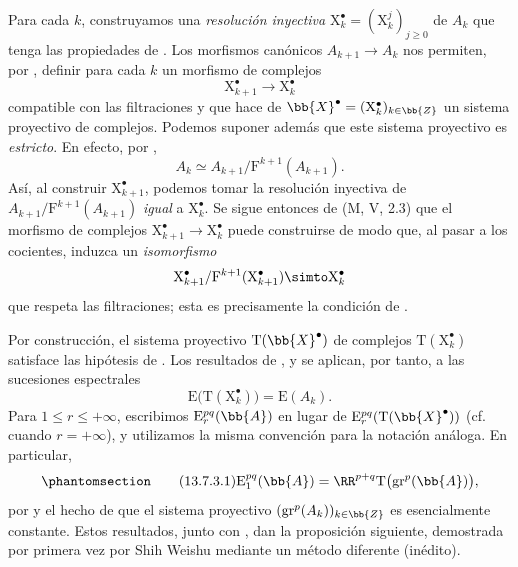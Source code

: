\documentclass[oneside]{amsart}
\renewcommand{\leq}{\leqslant}
\renewcommand{\geq}{\geqslant}
\newcommand{\oldpage}[2][]{{\marginnote{\normalfont\textbf{#1}~|~#2}}\ignorespaces}
\let\EGAOriginalLabel\label
\renewcommand{\label}[1]{\phantomsection\EGAOriginalLabel{#1}}
\begin{document}
\begin{env}[13.7.2]
\label{0.13.7.2}
Para cada $k$, construyamos una \emph{resolución inyectiva}
$\mathrm{X}_k^\bullet=(\mathrm{X}_k^j)_{j\geq0}$ de $A_k$ que tenga las
propiedades de .
Los morfismos canónicos $A_{k+1}\longrightarrow A_k$ nos permiten, por
, definir para cada $k$ un morfismo de complejos
\[
  \mathrm{X}_{k+1}^\bullet\longrightarrow\mathrm{X}_k^\bullet
\]
compatible con las filtraciones y que hace de
$\bb{X}^\bullet=(\mathrm{X}_k^\bullet)_{k\in\bb{Z}}$ un sistema
proyectivo de complejos.
\oldpage[0\textsubscript{III}]{76}
Podemos suponer además que este sistema proyectivo es \emph{estricto}.
En efecto, por ,
\[
  A_k
  \simeq
  A_{k+1}/\mathrm{F}^{k+1}(A_{k+1}).
\]
Así, al construir $\mathrm{X}_{k+1}^\bullet$, podemos tomar la
resolución inyectiva de
$A_{k+1}/\mathrm{F}^{k+1}(A_{k+1})$ \emph{igual} a
$\mathrm{X}_k^\bullet$.
Se sigue entonces de (M, V, 2.3) que el morfismo de complejos
$\mathrm{X}_{k+1}^\bullet\longrightarrow\mathrm{X}_k^\bullet$ puede
construirse de modo que, al pasar a los cocientes, induzca un
\emph{isomorfismo}
\[
  \mathrm{X}_{k+1}^\bullet/
  \mathrm{F}^{k+1}(\mathrm{X}_{k+1}^\bullet)
  \simto
  \mathrm{X}_k^\bullet
\]
que respeta las filtraciones; esta es precisamente la condición de
.
\end{env}

\begin{env}[13.7.3]
\label{0.13.7.3}
Por construcción, el sistema proyectivo
$\mathrm{T}(\bb{X}^\bullet)$ de complejos
$\mathrm{T}(\mathrm{X}_k^\bullet)$ satisface las hipótesis de
.
Los resultados de ,  y
 se aplican, por tanto, a las sucesiones espectrales
\[
  \mathrm{E}\bigl(\mathrm{T}(\mathrm{X}_k^\bullet)\bigr)
  =
  \mathrm{E}(A_k).
\]
Para $1\leq r\leq+\infty$, escribimos
$\mathrm{E}_r^{pq}(\bb{A})$ en lugar de
$\mathrm{E}_r^{pq}(\mathrm{T}(\bb{X}^\bullet))$
(cf.\  cuando $r=+\infty$), y utilizamos la misma convención
para la notación análoga.
En particular,
\begin{equation}
\label{0.13.7.3.1}
\tag{13.7.3.1}
  \mathrm{E}_1^{pq}(\bb{A})
  =
  \RR^{p+q}\mathrm{T}\bigl(\mathrm{gr}^p(\bb{A})\bigr),
\end{equation}
por  y el hecho de que el sistema proyectivo
$(\mathrm{gr}^p(A_k))_{k\in\bb{Z}}$ es esencialmente constante.
Estos resultados, junto con , dan la proposición
siguiente, demostrada por primera vez por Shih Weishu mediante un método
diferente (inédito).
\end{env}
\end{document}
